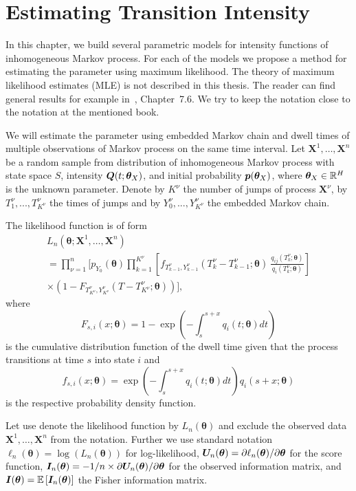 \chapter{Estimating Transition Intensity}
	\label{chap:statistics}

In this chapter, we build several parametric models for intensity functions of inhomogeneous Markov process. For each of the models we propose a method for estimating the parameter using maximum likelihood. The theory of maximum likelihood estimates (MLE) is not described in this thesis. The reader can find general results for example in~\cite{Andel11}, Chapter~7.6. We try to keep the notation close to the notation at the mentioned book.

We will estimate the parameter using embedded Markov chain and dwell times of multiple observations of Markov process on the same time interval. Let $\mathbf{X}^1, \dots, \mathbf{X}^n$ be a random sample from distribution of inhomogeneous Markov process with state space $S$, intensity $\bm{Q} (t; \bm{\theta}_X)$, and initial probability $\bm{p} (\bm{\theta}_X)$, where $\bm{\theta}_X \in \mathbb{R}^H$ is the unknown parameter. Denote by $K^{\nu}$ the number of jumps of process $\mathbf{X}^{\nu}$, by $T^{\nu}_1, ... , T^{\nu}_{K^{\nu}}$ the times of jumps and by $Y^{\nu}_0, ... , Y^{\nu}_{K^{\nu}}$ the embedded Markov chain.

The likelihood function is of form
\begin{multline}
	L_n (\bm{\theta}; \mathbf{X}^1, \dots, \mathbf{X}^n) \\
	=
	\prod_{\nu=1}^n \Biggl[ p_{Y_0} (\mathbf{ \bm{\theta} })
	\prod_{k=1}^{K^{\nu}} \left[ f_{T_{k-1}^{\nu}, Y_{k-1}^{\nu}} (T_k^{\nu} - T_{k-1}^{\nu}; \mathbf{ \bm{\theta} }) \: \frac{q_{ij} (T_k^{\nu}; \mathbf{ \bm{\theta} })}{q_{i} (T_k^{\nu}; \mathbf{ \bm{\theta} })} \right]
	\\ 
	\times \left( 1-F_{T_{K^{\nu}}^{\nu},Y_{K^{\nu}}^{\nu}} (T-T_{K^{\nu}}^{\nu}; \mathbf{ \bm{\theta} }) \right) \Biggr],
	\label{eq:generalLik}
\end{multline}
where
\[
	F_{s,i} (x; \bm{\theta}) = 1 - \exp \left(- \int_{s}^{s+x} q_i(t; \bm{\theta}) dt \right)
\]
is the cumulative distribution function of the dwell time given that the process transitions at time $s$ into state $i$ and
\[
	f_{s,i} (x; \bm{\theta}) = \exp \left(- \int_{s}^{s+x} q_i(t; \bm{\theta}) dt \right) q_i(s+x; \bm{\theta})
\]
is the respective probability density function.

Let use denote the likelihood function by $L_n (\bm{\theta})$ and exclude the observed data $\mathbf{X}^1, \dots, \mathbf{X}^n$ from the notation. Further we use standard notation $\ell_n (\bm{\theta}) = \log(L_n (\bm{\theta}))$ for log-likelihood, $\bm{U}_n (\bm{\theta}) = \partial \ell_n (\bm{\theta}) / \partial \bm{\theta}$ for the score function, $\bm{I}_n (\bm{\theta}) = -1/n \times \partial \bm{U}_n (\bm{\theta}) / \partial \bm{\theta}$ for the observed information matrix, and $\bm{I} (\bm{\theta}) = \operatorname{\mathbb{E}\,} [\bm{I}_n (\bm{\theta})]$ the Fisher information matrix.

